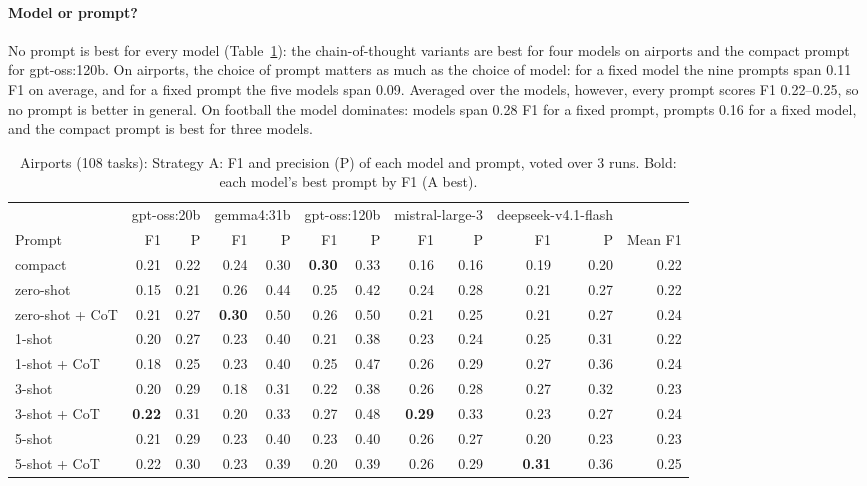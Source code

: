 \paragraph{Model or prompt?}
No prompt is best for every model (Table~\ref{tab:a-prompts}): the chain-of-thought variants are best for four models on
airports and the compact prompt for gpt-oss:120b. On airports, the choice of prompt matters as much as the choice of model:
for a fixed model the nine prompts span 0.11 F1 on average, and for a fixed prompt the five models span 0.09. Averaged over
the models, however, every prompt scores F1 0.22--0.25, so no prompt is better in general. On football the model dominates:
models span 0.28 F1 for a fixed prompt, prompts 0.16 for a fixed model, and the compact prompt is best for three models.

\begin{table}[t]
\centering
\caption{Airports (108 tasks): Strategy A: F1 and precision (P) of each model and prompt, voted over 3 runs. Bold: each model's best prompt by F1 (A best).}
\label{tab:a-prompts}
\small
\setlength{\tabcolsep}{3.5pt}
\begin{tabular}{lrrrrrrrrrrr}
\toprule
 & \multicolumn{2}{c}{gpt-oss:20b} & \multicolumn{2}{c}{gemma4:31b} & \multicolumn{2}{c}{gpt-oss:120b} & \multicolumn{2}{c}{mistral-large-3} & \multicolumn{2}{c}{deepseek-v4.1-flash} & \\
\cmidrule(lr){2-3}\cmidrule(lr){4-5}\cmidrule(lr){6-7}\cmidrule(lr){8-9}\cmidrule(lr){10-11}
Prompt & F1 & P & F1 & P & F1 & P & F1 & P & F1 & P & Mean F1 \\
\midrule
compact & 0.21 & 0.22 & 0.24 & 0.30 & \textbf{0.30} & 0.33 & 0.16 & 0.16 & 0.19 & 0.20 & 0.22 \\
zero-shot & 0.15 & 0.21 & 0.26 & 0.44 & 0.25 & 0.42 & 0.24 & 0.28 & 0.21 & 0.27 & 0.22 \\
zero-shot + CoT & 0.21 & 0.27 & \textbf{0.30} & 0.50 & 0.26 & 0.50 & 0.21 & 0.25 & 0.21 & 0.27 & 0.24 \\
1-shot & 0.20 & 0.27 & 0.23 & 0.40 & 0.21 & 0.38 & 0.23 & 0.24 & 0.25 & 0.31 & 0.22 \\
1-shot + CoT & 0.18 & 0.25 & 0.23 & 0.40 & 0.25 & 0.47 & 0.26 & 0.29 & 0.27 & 0.36 & 0.24 \\
3-shot & 0.20 & 0.29 & 0.18 & 0.31 & 0.22 & 0.38 & 0.26 & 0.28 & 0.27 & 0.32 & 0.23 \\
3-shot + CoT & \textbf{0.22} & 0.31 & 0.20 & 0.33 & 0.27 & 0.48 & \textbf{0.29} & 0.33 & 0.23 & 0.27 & 0.24 \\
5-shot & 0.21 & 0.29 & 0.23 & 0.40 & 0.23 & 0.40 & 0.26 & 0.27 & 0.20 & 0.23 & 0.23 \\
5-shot + CoT & 0.22 & 0.30 & 0.23 & 0.39 & 0.20 & 0.39 & 0.26 & 0.29 & \textbf{0.31} & 0.36 & 0.25 \\
\bottomrule
\end{tabular}
\end{table}


